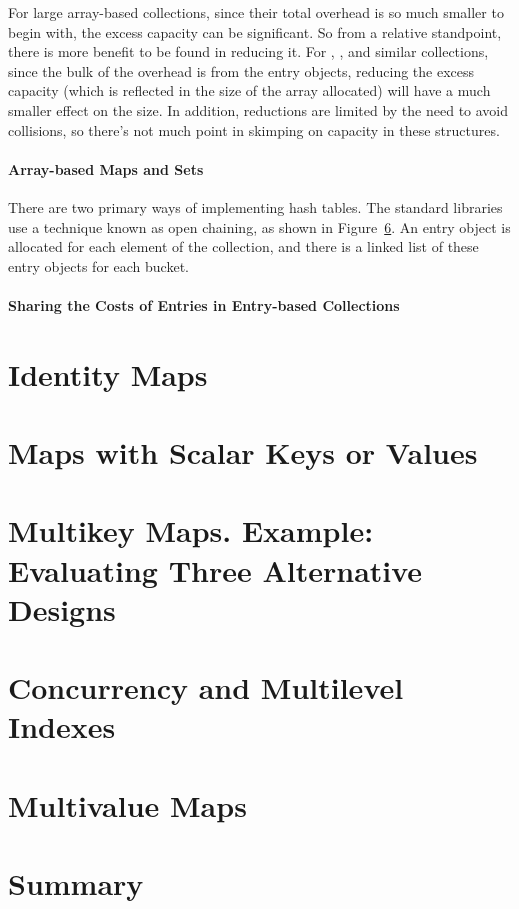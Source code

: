 For large array-based collections, since their total overhead is
so much smaller to begin with, the excess capacity can be significant. So from a
relative standpoint, there is more benefit to be found in reducing it.  For
, , and similar collections, since the bulk of the overhead is from the entry objects, reducing the excess capacity (which is
reflected in the size of the array allocated) will have a much smaller effect on
the size.  In addition, reductions are limited by the need to avoid
collisions, so there's not much point in skimping on capacity in these
structures.


\paragraph{Array-based Maps and Sets}

There are two primary ways of implementing hash tables.  The standard libraries
use a technique known as open chaining, as shown in Figure~\ref{}. An entry
object is allocated for each element of the collection, and there is a linked
list of these entry objects for each bucket.


\paragraph{Sharing the Costs of Entries in Entry-based Collections}

\section{Identity Maps}

\section{Maps with Scalar Keys or Values}

\section{Multikey Maps. Example: Evaluating Three Alternative Designs}

\section{Concurrency and Multilevel Indexes}

\section{Multivalue Maps}

\section{Summary}



